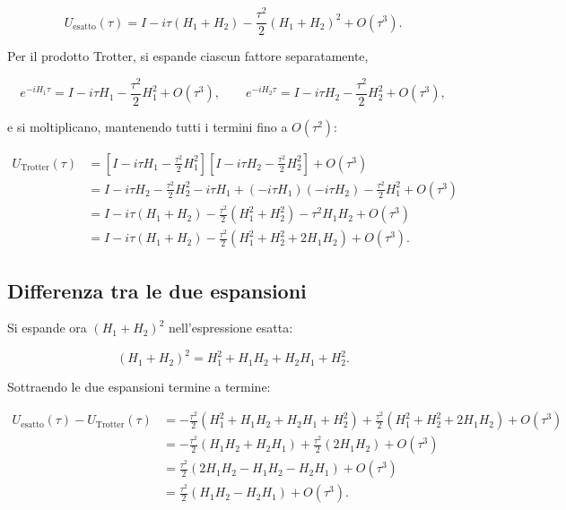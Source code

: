 \documentclass[11pt,a4paper]{article}
\begin{document}
\begin{equation}
U_{\text{esatto}}(\tau) = I - i\tau(H_1+H_2) - \frac{\tau^2}{2}(H_1+H_2)^2 + O(\tau^3).
\end{equation}

Per il prodotto Trotter, si espande ciascun fattore separatamente,

\begin{equation}
e^{-iH_1\tau} = I - i\tau H_1 - \frac{\tau^2}{2}H_1^2 + O(\tau^3), \qquad e^{-iH_2\tau} = I - i\tau H_2 - \frac{\tau^2}{2}H_2^2 + O(\tau^3),
\end{equation}

e si moltiplicano, mantenendo tutti i termini fino a $O(\tau^2)$:

\begin{align}
U_{\text{Trotter}}(\tau) &= \left[I-i\tau H_1-\frac{\tau^2}{2}H_1^2\right]\left[I-i\tau H_2-\frac{\tau^2}{2}H_2^2\right]+O(\tau^3)\\
&= I - i\tau H_2 - \frac{\tau^2}{2}H_2^2 - i\tau H_1 + (-i\tau H_1)(-i\tau H_2) - \frac{\tau^2}{2}H_1^2 + O(\tau^3)\\
&= I - i\tau(H_1+H_2) - \frac{\tau^2}{2}\left(H_1^2+H_2^2\right) - \tau^2 H_1H_2 + O(\tau^3)\\
&= I - i\tau(H_1+H_2) - \frac{\tau^2}{2}\left(H_1^2+H_2^2+2H_1H_2\right) + O(\tau^3).
\end{align}

\subsection{Differenza tra le due espansioni}

Si espande ora $(H_1+H_2)^2$ nell'espressione esatta:

\begin{equation}
(H_1+H_2)^2 = H_1^2 + H_1H_2 + H_2H_1 + H_2^2.
\end{equation}

Sottraendo le due espansioni termine a termine:

\begin{align}
U_{\text{esatto}}(\tau) - U_{\text{Trotter}}(\tau) &= -\frac{\tau^2}{2}\left(H_1^2+H_1H_2+H_2H_1+H_2^2\right) + \frac{\tau^2}{2}\left(H_1^2+H_2^2+2H_1H_2\right) + O(\tau^3)\\
&= -\frac{\tau^2}{2}\left(H_1H_2+H_2H_1\right) + \frac{\tau^2}{2}\left(2H_1H_2\right) + O(\tau^3)\\
&= \frac{\tau^2}{2}\left(2H_1H_2-H_1H_2-H_2H_1\right) + O(\tau^3)\\
&= \frac{\tau^2}{2}\left(H_1H_2-H_2H_1\right) + O(\tau^3).
\end{align}
\end{document}
